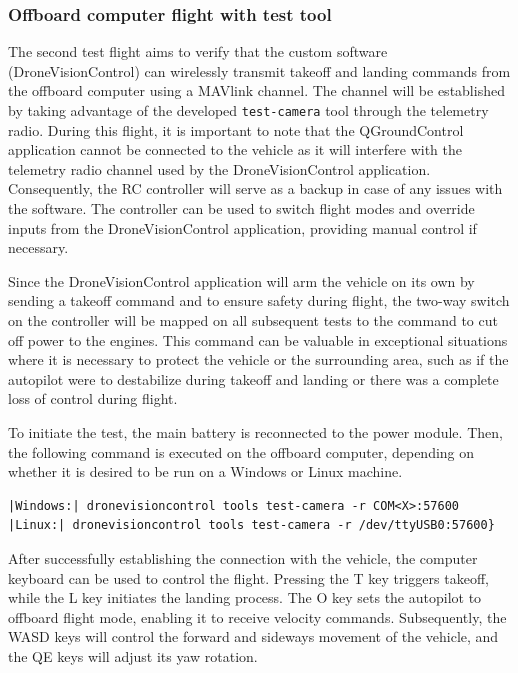 \subsubsection{Offboard computer flight with test tool}
\label{subsec:fl-test-2}

The second test flight aims to verify that the custom software (DroneVisionControl) can wirelessly transmit takeoff and landing commands from the offboard computer using a MAVlink channel. The channel will be established by taking advantage of the developed \texttt{test-camera} tool through the telemetry radio. During this flight, it is important to note that the QGroundControl application cannot be connected to the vehicle as it will interfere with the telemetry radio channel used by the DroneVisionControl application. Consequently, the RC controller will serve as a backup in case of any issues with the software. The controller can be used to switch flight modes and override inputs from the DroneVisionControl application, providing manual control if necessary.

Since the DroneVisionControl application will arm the vehicle on its own by sending a takeoff command and to ensure safety during flight, the two-way switch on the controller will be mapped on all subsequent tests to the command to cut off power to the engines. This command can be valuable in exceptional situations where it is necessary to protect the vehicle or the surrounding area, such as if the autopilot were to destabilize during takeoff and landing or there was a complete loss of control during flight.

To initiate the test, the main battery is reconnected to the power module. Then, the following command is executed on the offboard computer, depending on whether it is desired to be run on a Windows or Linux machine.


\begin{verbatim}
|Windows:| dronevisioncontrol tools test-camera -r COM<X>:57600
|Linux:| dronevisioncontrol tools test-camera -r /dev/ttyUSB0:57600}
\end{verbatim}


After successfully establishing the connection with the vehicle, the computer keyboard can be used to control the flight. Pressing the T key triggers takeoff, while the L key initiates the landing process. The O key sets the autopilot to offboard flight mode, enabling it to receive velocity commands. Subsequently, the WASD keys will control the forward and sideways movement of the vehicle, and the QE keys will adjust its yaw rotation.

